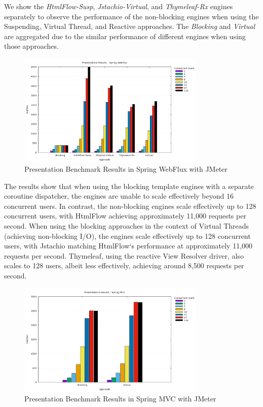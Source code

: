 We show the \textit{HtmlFlow-Susp}, \textit{Jstachio-Virtual}, and \textit{Thymeleaf-Rx} engines
separately to observe the performance of the non-blocking engines when using
the Suspending, Virtual Thread, and Reactive approaches. The \textit{Blocking}
and \textit{Virtual} are aggregated due to the similar performance of different
engines when using those approaches.

\begin{figure}[h]
     \centering
     \includegraphics[width=0.8\textwidth]{./Graphs/presentations-webflux-jmeter.png}
     \caption{Presentation Benchmark Results in Spring WebFlux with JMeter}\label{fig:presentations-webflux-jmeter}
\end{figure}

The results show that when using the blocking template engines with a separate
coroutine dispatcher, the engines are unable to scale effectively beyond 16
concurrent users. In contrast, the non-blocking engines scale effectively up to
128 concurrent users, with HtmlFlow achieving approximately 11,000 requests per
second. When using the blocking approaches in the context of Virtual Threads
(achieving non-blocking I/O), the engines scale effectively up to 128
concurrent users, with Jstachio matching HtmlFlow`s performance at
approximately 11,000 requests per second. Thymeleaf, using the reactive View
Resolver driver, also scales to 128 users, albeit less effectively, achieving
around 8,500 requests per second.

\begin{figure}[h]
     \centering
     \includegraphics[width=0.8\textwidth]{./Graphs/presentations-springmvc-jmeter.png}
     \caption{Presentation Benchmark Results in Spring MVC with JMeter}\label{fig:presentations-springmvc-jmeter}
\end{figure}

